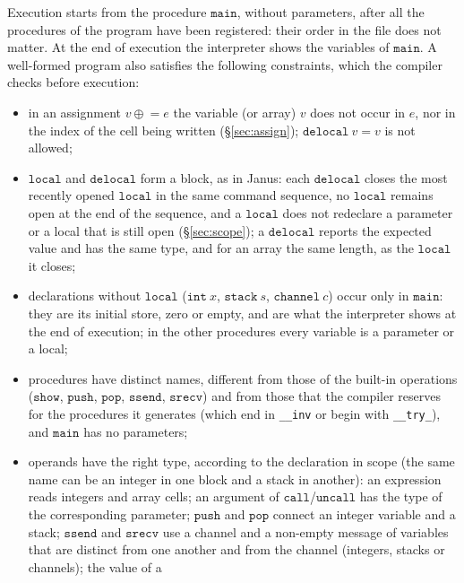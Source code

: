 \medskip
\noindent
Execution starts from the procedure $\mathtt{main}$, without parameters, after
all the procedures of the program have been registered: their order in the file
does not matter. At the end of execution the interpreter shows the variables of
$\mathtt{main}$. A well-formed program also satisfies the following constraints,
which the compiler checks before execution:
\begin{itemize}
  \item in an assignment $v \mathrel{\oplus}= e$ the variable (or array) $v$
    does not occur in $e$, nor in the index of the cell being written
    (\S\ref{sec:assign}); $\mathtt{delocal}\ v = v$ is not allowed;
  \item $\mathtt{local}$ and $\mathtt{delocal}$ form a block, as in Janus:
    each $\mathtt{delocal}$ closes the most recently opened $\mathtt{local}$
    in the same command sequence, no $\mathtt{local}$ remains open at the
    end of the sequence, and a $\mathtt{local}$ does not redeclare a parameter or a
    local that is still open (\S\ref{sec:scope}); a $\mathtt{delocal}$ reports the
    expected value and has the same type, and for an array the same length, as the
    $\mathtt{local}$ it closes;
  \item declarations without $\mathtt{local}$ ($\mathtt{int}\ x$,
    $\mathtt{stack}\ s$, $\mathtt{channel}\ c$) occur only in
    $\mathtt{main}$: they are its initial store, zero or empty, and are what the
    interpreter shows at the end of execution; in the other procedures every variable
    is a parameter or a local;
  \item procedures have distinct names, different from those of the built-in
    operations ($\mathtt{show}$, $\mathtt{push}$, $\mathtt{pop}$,
    $\mathtt{ssend}$, $\mathtt{srecv}$) and from those that the compiler reserves
    for the procedures it generates (which end in \texttt{\_\_inv} or begin
    with \texttt{\_\_try\_}), and $\mathtt{main}$ has no parameters;
  \item operands have the right type, according to the declaration in scope
    (the same name can be an integer in one block and a stack in another): an expression reads integers and array cells; an argument of
    $\mathtt{call}$/$\mathtt{uncall}$ has the type of the corresponding parameter;
    $\mathtt{push}$ and $\mathtt{pop}$ connect an integer variable and a
    stack; $\mathtt{ssend}$ and $\mathtt{srecv}$ use a channel and a non-empty
    message of variables that are distinct from one another and from the channel
    (integers, stacks or channels); the value of a

\end{itemize}
